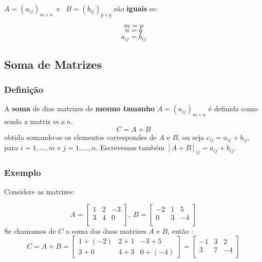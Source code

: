 \documentclass{article}
\begin{document}
$ A = (a_{ij})_{m \times n} $\ e \ $ B = (b_{ij})_{p \times q} $ são \textbf{iguais} se: \newline
\begin{center}
    $$ m = p $$
    $$ n = q $$
    $$ a_{ij} = b_{ij} $$
\end{center}

\subsection{Soma de Matrizes}
\subsubsection{Definição}
 A \textbf{soma} de dias matrizes de \textbf{mesmo tamanho} $A = (a_{ij})_{m \times n}$
 é definida como sendo a matriz $m \ x \ n$.
 $$C = A + B$$
 obtida somando-se os elementos correspondes de $A$ e $B$, ou seja \bigbreak
 $ c_{ij} = a_{ij} + b_{ij}$, \bigbreak
 para $ i = 1, \hdots, m $ e $j = 1, \hdots, n $. Escrevemos também $[A + B]_{ij} = a_{ij} + b_{ij}$.

\subsubsection{Exemplo}
Considere as matrizes:

\begin{equation}
    A = 
    \begin{bmatrix}
    1 & 2 & -3 \\
    3 & 4 & 0 \\
    \end{bmatrix}, \
    B = 
    \begin{bmatrix}
    -2 & 1 & 5 \\
    0 & 3 & -4 \\
    \end{bmatrix}
\end{equation}
 Se chamamos de $C$ a soma das duas matrizes $A$ e $B$, então :
 \begin{equation}
    C = A + B = 
    \begin{bmatrix}
        1 + (-2) & 2+1 & -3+5 \\
        3+0 & 4+3 & 0+(-4)
    \end{bmatrix}
    = 
    \begin{bmatrix}
        -1 & 3 & 2 \\
        3 & 7 & -4 \\
    \end{bmatrix}
 \end{equation}
\end{document}

